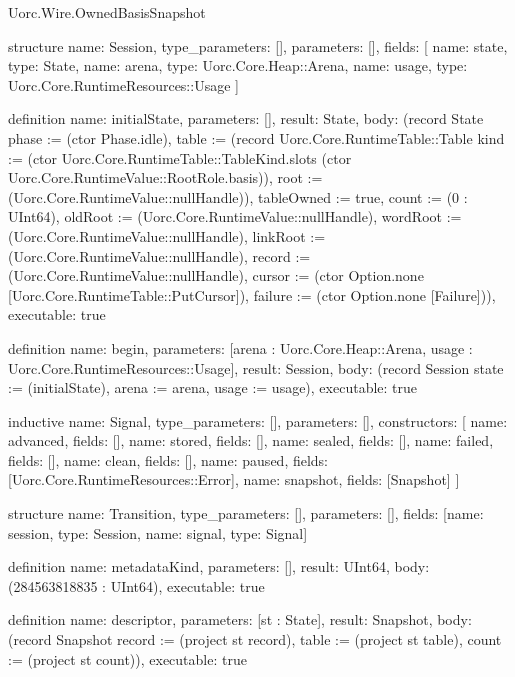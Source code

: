 \begin{lexlean}{Uorc.Wire.OwnedBasisSnapshot}
\begin{semanticmodule}
structure{
  name: Session,
  type_parameters: [],
  parameters: [],
  fields: [
    {name: state, type: State},
    {name: arena, type: Uorc.Core.Heap::Arena},
    {name: usage, type: Uorc.Core.RuntimeResources::Usage}
  ]
}

definition{
  name: initialState,
  parameters: [],
  result: State,
  body: (record State {phase := (ctor Phase.idle), table := (record Uorc.Core.RuntimeTable::Table {kind := (ctor Uorc.Core.RuntimeTable::TableKind.slots (ctor Uorc.Core.RuntimeValue::RootRole.basis)), root := (Uorc.Core.RuntimeValue::nullHandle)}), tableOwned := true, count := (0 : UInt64), oldRoot := (Uorc.Core.RuntimeValue::nullHandle), wordRoot := (Uorc.Core.RuntimeValue::nullHandle), linkRoot := (Uorc.Core.RuntimeValue::nullHandle), record := (Uorc.Core.RuntimeValue::nullHandle), cursor := (ctor Option.none [Uorc.Core.RuntimeTable::PutCursor]), failure := (ctor Option.none [Failure])}),
  executable: true
}

definition{
  name: begin,
  parameters: [arena : Uorc.Core.Heap::Arena, usage : Uorc.Core.RuntimeResources::Usage],
  result: Session,
  body: (record Session {state := (initialState), arena := arena, usage := usage}),
  executable: true
}

inductive{
  name: Signal,
  type_parameters: [],
  parameters: [],
  constructors: [
    {name: advanced, fields: []},
    {name: stored, fields: []},
    {name: sealed, fields: []},
    {name: failed, fields: []},
    {name: clean, fields: []},
    {name: paused, fields: [Uorc.Core.RuntimeResources::Error]},
    {name: snapshot, fields: [Snapshot]}
  ]
}

structure{
  name: Transition,
  type_parameters: [],
  parameters: [],
  fields: [{name: session, type: Session}, {name: signal, type: Signal}]
}

definition{
  name: metadataKind,
  parameters: [],
  result: UInt64,
  body: (284563818835 : UInt64),
  executable: true
}

definition{
  name: descriptor,
  parameters: [st : State],
  result: Snapshot,
  body: (record Snapshot {record := (project st record), table := (project st table), count := (project st count)}),
  executable: true
}


\end{semanticmodule}
\end{lexlean}
